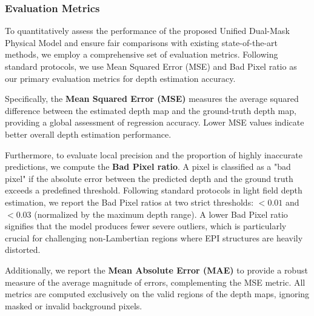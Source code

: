 \subsubsection{Evaluation Metrics}

To quantitatively assess the performance of the proposed Unified Dual-Mask Physical Model and ensure fair comparisons with existing state-of-the-art methods, we employ a comprehensive set of evaluation metrics. Following standard protocols, we use Mean Squared Error (MSE) and Bad Pixel ratio as our primary evaluation metrics for depth estimation accuracy.

Specifically, the \textbf{Mean Squared Error (MSE)} measures the average squared difference between the estimated depth map and the ground-truth depth map, providing a global assessment of regression accuracy. Lower MSE values indicate better overall depth estimation performance.

Furthermore, to evaluate local precision and the proportion of highly inaccurate predictions, we compute the \textbf{Bad Pixel ratio}. A pixel is classified as a "bad pixel" if the absolute error between the predicted depth and the ground truth exceeds a predefined threshold. Following standard protocols in light field depth estimation, we report the Bad Pixel ratios at two strict thresholds: $<0.01$ and $<0.03$ (normalized by the maximum depth range). A lower Bad Pixel ratio signifies that the model produces fewer severe outliers, which is particularly crucial for challenging non-Lambertian regions where EPI structures are heavily distorted.

Additionally, we report the \textbf{Mean Absolute Error (MAE)} to provide a robust measure of the average magnitude of errors, complementing the MSE metric. All metrics are computed exclusively on the valid regions of the depth maps, ignoring masked or invalid background pixels.